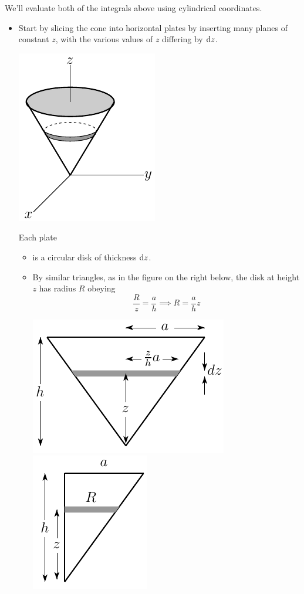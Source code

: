 \begin{eg}
We'll evaluate both of the integrals above using cylindrical coordinates.
\begin{itemize}
\item
Start by slicing the cone into horizontal plates by inserting many planes of
constant $z$, with the various values of $z$ differing by $\mathrm{d}z$.
\begin{efig}
\begin{center}
    \includegraphics{coneP.pdf}
\end{center}
\end{efig}
Each plate
\vspace{-\topsep}
\begin{itemize} \itemsep1pt \parskip0pt 
\item
is a circular disk of thickness $\mathrm{d}z$.
\item
By similar triangles, as in the figure on the right below,
the disk at height $z$ has radius $R$ obeying
\begin{equation*}
\frac{R}{z} = \frac{a}{h}
\implies R =\frac{a}{h}z
\end{equation*}
\begin{efig}
\begin{center}
    \includegraphics{coneX.pdf}\qquad
    \includegraphics{coneT.pdf}

\end{center}
\end{efig}
\end{itemize}
\end{itemize}
\end{eg}
